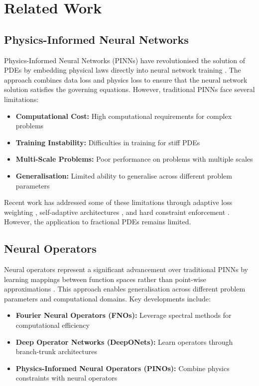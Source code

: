 \documentclass[12pt,a4paper]{article}
\theoremstyle{definition}
\begin{document}
\section{Related Work}
\label{sec:related}

\subsection{Physics-Informed Neural Networks}

Physics-Informed Neural Networks (PINNs) have revolutionised the solution of PDEs by embedding physical laws directly into neural network training \citep{raissi2019physics,cuomo2022scientific}. The approach combines data loss and physics loss to ensure that the neural network solution satisfies the governing equations. However, traditional PINNs face several limitations:

\begin{itemize}
    \item \textbf{Computational Cost:} High computational requirements for complex problems
    \item \textbf{Training Instability:} Difficulties in training for stiff PDEs
    \item \textbf{Multi-Scale Problems:} Poor performance on problems with multiple scales
    \item \textbf{Generalisation:} Limited ability to generalise across different problem parameters
\end{itemize}

Recent work has addressed some of these limitations through adaptive loss weighting \citep{wang2021understanding}, self-adaptive architectures \citep{mcclenny2020self}, and hard constraint enforcement \citep{jin2021ns}. However, the application to fractional PDEs remains limited.

\subsection{Neural Operators}

Neural operators represent a significant advancement over traditional PINNs by learning mappings between function spaces rather than point-wise approximations \citep{li2020neural,lu2021learning}. This approach enables generalisation across different problem parameters and computational domains. Key developments include:

\begin{itemize}
    \item \textbf{Fourier Neural Operators (FNOs):} Leverage spectral methods for computational efficiency \citep{li2020fourier}
    \item \textbf{Deep Operator Networks (DeepONets):} Learn operators through branch-trunk architectures \citep{lu2021learning}
    \item \textbf{Physics-Informed Neural Operators (PINOs):} Combine physics constraints with neural operators \citep{li2021physics}
\end{itemize}
\end{document}
